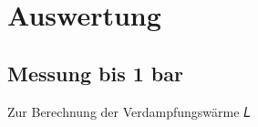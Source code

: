 \section{Auswertung}
\label{sec:Auswertung}

\subsection{Messung bis 1 bar}

Zur Berechnung der Verdampfungswärme 𝐿